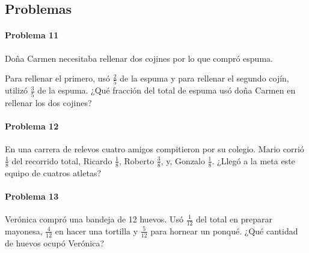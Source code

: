 \documentclass[10pt,twoside]{article}
\begin{document}
\subsection*{Problemas}
\paragraph*{Problema 11}
Doña Carmen necesitaba rellenar dos cojines por lo que compró espuma.

Para rellenar el primero, usó $\frac{2}{5}$ de la espuma y para rellenar el segundo cojín, utilizó $\frac{3}{5}$ de la espuma. ¿Qué fracción del total de espuma usó doña Carmen en rellenar los dos cojines?
\paragraph*{Problema 12}
En una carrera de relevos cuatro amigos compitieron por su colegio. Mario corrió $\frac{1}{8}$ del recorrido total, Ricardo $\frac{1}{8}$, Roberto $\frac{3}{8}$, y, Gonzalo $\frac{1}{8}$. ¿Llegó a la meta este equipo de cuatros atletas?
\paragraph*{Problema 13}
Verónica compró una bandeja de 12 huevos. Usó $\frac{1}{12}$ del total en preparar mayonesa, $\frac{4}{12}$ en hacer una tortilla y $\frac{5}{12}$ para hornear un ponqué. ¿Qué cantidad de huevos ocupó Verónica?
\end{document}
